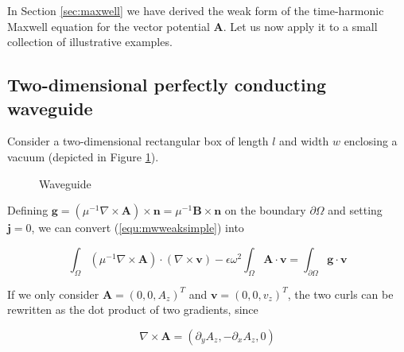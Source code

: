 \documentclass[11pt, a4paper]{article}
\begin{document}
In Section \ref{sec:maxwell} we have derived the weak form of the time-harmonic
Maxwell equation for the vector potential $\mathbf{A}$. Let us now apply it to
a small collection of illustrative examples.

\subsection{Two-dimensional perfectly conducting waveguide}
\label{subsec:2dwaveguide}

Consider a two-dimensional rectangular box of length $l$ and width $w$ enclosing
a vacuum (depicted in Figure \ref{fig:waveguide}).

\begin{figure}[h]
    \centering
    \caption{Waveguide}
    \label{fig:waveguide}
\end{figure}

Defining $\mathbf{g} = ({\mu^{-1} \nabla \times \mathbf{A}}) \times \mathbf{n} =
\mu^{-1} \mathbf{B} \times \mathbf{n}$ on the boundary $\partial \Omega$
and setting $\mathbf{j} = 0$, we can convert (\ref{equ:mwweaksimple}) into

\begin{equation}
    \int_{\Omega} (\mu^{-1} \nabla \times \mathbf{A}) \cdot (\nabla \times \mathbf{v})
    - \epsilon \omega^2 \int_{\Omega} \mathbf{A} \cdot \mathbf{v} 
    = \int_{\partial \Omega} \mathbf{g} \cdot \mathbf{v} \label{equ:mwweakwaveguide}
\end{equation}

If we only consider $\mathbf{A} = (0, 0, A_z)^T$ and $\mathbf{v} = (0, 0, v_z)^T$,
the two curls can be rewritten as the dot product of two gradients, since 

\begin{equation}
    \nabla \times \mathbf{A} = (\partial_y A_z, -\partial_x A_z, 0)
\end{equation}
\end{document}
